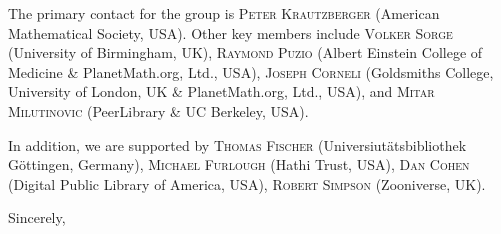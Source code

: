 \documentclass[10pt]{article}
\begin{document}
The primary contact for the group is \textsc{Peter Krautzberger}
(American Mathematical Society, USA).  Other key members include
\textsc{Volker Sorge} (University of Birmingham, UK), \textsc{Raymond
  Puzio} (Albert Einstein College of Medicine \& PlanetMath.org, Ltd.,
USA), \textsc{Joseph Corneli} (Goldsmiths College, University of
London, UK \& PlanetMath.org, Ltd., USA), and \textsc{Mitar
  Milutinovic} (PeerLibrary \& UC Berkeley, USA).

In addition, we are supported by \textsc{Thomas Fischer} (Universiut{\"a}tsbibliothek
G{\"o}ttingen, Germany), \textsc{Michael Furlough} (Hathi Trust, USA), \textsc{Dan Cohen} (Digital Public Library of America, USA), \textsc{Robert Simpson} (Zooniverse, UK).
\begin{flushright}
Sincerely,\\
\quad \\
\quad \\
\quad 
\end{flushright}
\end{document}
